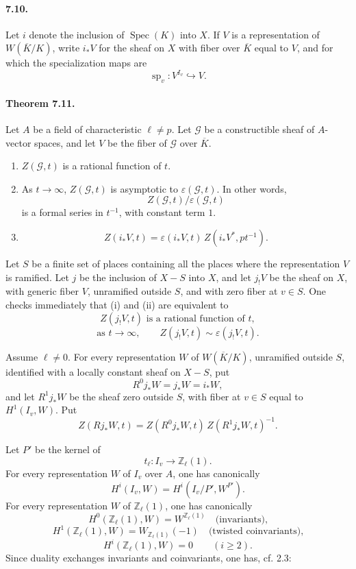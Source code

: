 \documentclass[10pt]{article}
\newcommand{\Spec}{\operatorname{Spec}}
\providecommand{\spc}{\operatorname{sp}}
\providecommand{\Spec}{\operatorname{Spec}}
\providecommand{\spc}{\operatorname{sp}}
\providecommand{\Spec}{\operatorname{Spec}}
\providecommand{\Spec}{\operatorname{Spec}}
\providecommand{\spc}{\operatorname{sp}}
\begin{document}
\paragraph{7.10.} Let \(i\) denote the inclusion of \(\Spec(K)\) into \(X\). If \(V\) is a representation of \(W(\overline K/K)\), write \(i_*V\) for the sheaf on \(X\) with fiber over \(\overline K\) equal to \(V\), and for which the specialization maps are
\[
\spc_v:V^{I_v}\hookrightarrow V.
\]

\paragraph{Theorem 7.11.} Let \(A\) be a field of characteristic \(\ell\ne p\). Let \(\mathcal G\) be a constructible sheaf of \(A\)-vector spaces, and let \(V\) be the fiber of \(\mathcal G\) over \(\overline K\).
\begin{enumerate}[label=(\roman*)]
\item \(Z(\mathcal G,t)\) is a rational function of \(t\).
\item As \(t\to\infty\), \(Z(\mathcal G,t)\) is asymptotic to \(\varepsilon(\mathcal G,t)\). In other words,
\[
Z(\mathcal G,t)/\varepsilon(\mathcal G,t)
\]
is a formal series in \(t^{-1}\), with constant term \(1\).
\item
\[
Z(i_*V,t)=\varepsilon(i_*V,t)\,Z(i_*V^*,pt^{-1}).
\]
\end{enumerate}

Let \(S\) be a finite set of places containing all the places where the representation \(V\) is ramified. Let \(j\) be the inclusion of \(X-S\) into \(X\), and let \(j_!V\) be the sheaf on \(X\), with generic fiber \(V\), unramified outside \(S\), and with zero fiber at \(v\in S\). One checks immediately that (i) and (ii) are equivalent to
\[
\tag{i'}
Z(j_!V,t)\text{ is a rational function of }t,
\]
\[
\tag{ii'}
\text{as }t\to\infty,\qquad Z(j_!V,t)\sim\varepsilon(j_!V,t).
\]

Assume \(\ell\ne0\). For every representation \(W\) of \(W(\overline K/K)\), unramified outside \(S\), identified with a locally constant sheaf on \(X-S\), put
\[
R^0j_*W=j_*W=i_*W,
\]
and let \(R^1j_*W\) be the sheaf zero outside \(S\), with fiber at \(v\in S\) equal to \(H^1(I_v,W)\). Put
\[
\tag{7.11.1}
Z(Rj_*W,t)=Z(R^0j_*W,t)\,Z(R^1j_*W,t)^{-1}.
\]

Let \(P'\) be the kernel of
\[
t_\ell:I_v\longrightarrow \mathbb Z_\ell(1).
\]
For every representation \(W\) of \(I_v\) over \(A\), one has canonically
\[
\tag{7.11.2}
H^i(I_v,W)=H^i(I_v/P',W^{P'}).
\]
For every representation \(W\) of \(\mathbb Z_\ell(1)\), one has canonically
\[
\tag{7.11.3}
H^0(\mathbb Z_\ell(1),W)=W^{\mathbb Z_\ell(1)}
\quad\text{(invariants),}
\]
\[
H^1(\mathbb Z_\ell(1),W)=W_{\mathbb Z_\ell(1)}(-1)
\quad\text{(twisted coinvariants),}
\]
\[
H^i(\mathbb Z_\ell(1),W)=0\qquad(i\ge2).
\]
Since duality exchanges invariants and coinvariants, one has, cf. 2.3:
\end{document}
